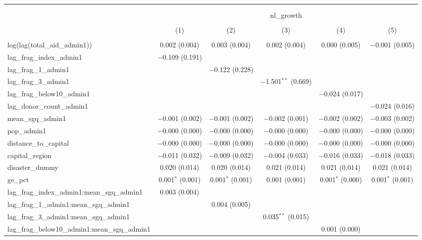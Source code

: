 
\begin{table}[!htbp] \centering 
  \caption{} 
  \label{} 
\begin{tabular}{@{\extracolsep{2pt}}lccccc} 
\\[-1.8ex]\hline 
\hline \\[-1.8ex] 
\\[-1.8ex] & \multicolumn{5}{c}{nl\_growth} \\ 
\\[-1.8ex] & (1) & (2) & (3) & (4) & (5)\\ 
\hline \\[-1.8ex] 
 log(lag(total\_aid\_admin1)) & 0.002 (0.004) & 0.003 (0.004) & 0.002 (0.004) & 0.000 (0.005) & $-$0.001 (0.005) \\ 
  lag\_frag\_index\_admin1 & $-$0.109 (0.191) &  &  &  &  \\ 
  lag\_frag\_1\_admin1 &  & $-$0.122 (0.228) &  &  &  \\ 
  lag\_frag\_3\_admin1 &  &  & $-$1.501$^{**}$ (0.669) &  &  \\ 
  lag\_frag\_below10\_admin1 &  &  &  & $-$0.024 (0.017) &  \\ 
  lag\_donor\_count\_admin1 &  &  &  &  & $-$0.024 (0.016) \\ 
  mean\_sgq\_admin1 & $-$0.001 (0.002) & $-$0.001 (0.002) & $-$0.002 (0.001) & $-$0.002 (0.002) & $-$0.003 (0.002) \\ 
  pop\_admin1 & $-$0.000 (0.000) & $-$0.000 (0.000) & $-$0.000 (0.000) & $-$0.000 (0.000) & $-$0.000 (0.000) \\ 
  distance\_to\_capital & $-$0.000 (0.000) & $-$0.000 (0.000) & $-$0.000 (0.000) & $-$0.000 (0.000) & $-$0.000 (0.000) \\ 
  capital\_region & $-$0.011 (0.032) & $-$0.009 (0.032) & $-$0.004 (0.033) & $-$0.016 (0.033) & $-$0.018 (0.033) \\ 
  disaster\_dummy & 0.020 (0.014) & 0.020 (0.014) & 0.021 (0.014) & 0.021 (0.014) & 0.021 (0.014) \\ 
  ge\_pct & 0.001$^{*}$ (0.001) & 0.001$^{*}$ (0.001) & 0.001 (0.001) & 0.001$^{*}$ (0.000) & 0.001$^{*}$ (0.001) \\ 
  lag\_frag\_index\_admin1:mean\_sgq\_admin1 & 0.003 (0.004) &  &  &  &  \\ 
  lag\_frag\_1\_admin1:mean\_sgq\_admin1 &  & 0.004 (0.005) &  &  &  \\ 
  lag\_frag\_3\_admin1:mean\_sgq\_admin1 &  &  & 0.035$^{**}$ (0.015) &  &  \\ 
  lag\_frag\_below10\_admin1:mean\_sgq\_admin1 &  &  &  & 0.001 (0.000) &  \\ 

\end{tabular}
\end{table}
